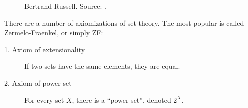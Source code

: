 \begin{figure}[ht]
    \centering
    \caption{Bertrand Russell. Source: \cite{russellpic}.}
\end{figure}

There are a number of axiomizations of set theory. The most popular is called
Zermelo-Fraenkel, or simply ZF:

\begin{description}
  \item[1. Axiom of extensionality] If two sets have the same elements, they are
    equal.
  \item[2. Axiom of power set] For every set $X$, there is a ``power set'',
    denoted $2^X$.
\end{description}
